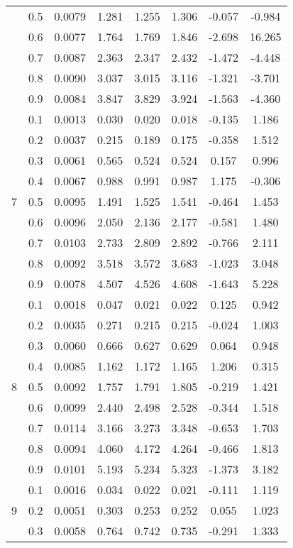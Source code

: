\documentclass[11pt,a4paper]{report}
\begin{document}
\begin{longtable}{ | c | c || c | c | c | c | c | c | }
 & 0.5 & 0.0079 & 1.281 & 1.255 & 1.306 & -0.057 & -0.984 \\
 & 0.6 & 0.0077 & 1.764 & 1.769 & 1.846 & -2.698 & 16.265 \\
 & 0.7 & 0.0087 & 2.363 & 2.347 & 2.432 & -1.472 & -4.448 \\
 & 0.8 & 0.0090 & 3.037 & 3.015 & 3.116 & -1.321 & -3.701 \\
 & 0.9 & 0.0084 & 3.847 & 3.829 & 3.924 & -1.563 & -4.360 \\
 \hline
\multirow{9}{*}{7} & 0.1 & 0.0013 & 0.030 & 0.020 & 0.018 & -0.135 & 1.186 \\
 & 0.2 & 0.0037 & 0.215 & 0.189 & 0.175 & -0.358 & 1.512 \\
 & 0.3 & 0.0061 & 0.565 & 0.524 & 0.524 & 0.157 & 0.996 \\
 & 0.4 & 0.0067 & 0.988 & 0.991 & 0.987 & 1.175 & -0.306 \\
 & 0.5 & 0.0095 & 1.491 & 1.525 & 1.541 & -0.464 & 1.453 \\
 & 0.6 & 0.0096 & 2.050 & 2.136 & 2.177 & -0.581 & 1.480 \\
 & 0.7 & 0.0103 & 2.733 & 2.809 & 2.892 & -0.766 & 2.111 \\
 & 0.8 & 0.0092 & 3.518 & 3.572 & 3.683 & -1.023 & 3.048 \\
 & 0.9 & 0.0078 & 4.507 & 4.526 & 4.608 & -1.643 & 5.228 \\
 \hline
\multirow{9}{*}{8} & 0.1 & 0.0018 & 0.047 & 0.021 & 0.022 & 0.125 & 0.942 \\
 & 0.2 & 0.0035 & 0.271 & 0.215 & 0.215 & -0.024 & 1.003 \\
 & 0.3 & 0.0060 & 0.666 & 0.627 & 0.629 & 0.064 & 0.948 \\
 & 0.4 & 0.0085 & 1.162 & 1.172 & 1.165 & 1.206 & 0.315 \\
 & 0.5 & 0.0092 & 1.757 & 1.791 & 1.805 & -0.219 & 1.421 \\
 & 0.6 & 0.0099 & 2.440 & 2.498 & 2.528 & -0.344 & 1.518 \\
 & 0.7 & 0.0114 & 3.166 & 3.273 & 3.348 & -0.653 & 1.703 \\
 & 0.8 & 0.0094 & 4.060 & 4.172 & 4.264 & -0.466 & 1.813 \\
 & 0.9 & 0.0101 & 5.193 & 5.234 & 5.323 & -1.373 & 3.182 \\
 \hline
\multirow{9}{*}{9} & 0.1 & 0.0016 & 0.034 & 0.022 & 0.021 & -0.111 & 1.119 \\
 & 0.2 & 0.0051 & 0.303 & 0.253 & 0.252 & 0.055 & 1.023 \\
 & 0.3 & 0.0058 & 0.764 & 0.742 & 0.735 & -0.291 & 1.333 \\

\end{longtable}
\end{document}
